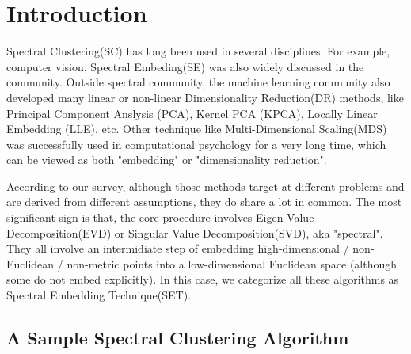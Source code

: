 \pagebreak
\setcounter{tocdepth}{3}
\tableofcontents
\pagebreak



\section{Introduction}
\label{sec:introduction}

Spectral Clustering(SC) has long been used in several disciplines. 
For example, computer vision\cite{shi2000normalized}.
Spectral Embeding(SE) was 
also widely discussed in the community\cite{brand2003unifying}. 
Outside spectral community, the machine learning community also 
developed many linear or non-linear Dimensionality Reduction(DR) methods, 
like Principal Component Anslysis (PCA), Kernel PCA (KPCA)\cite{scholkopf1998kpca}, 
Locally Linear Embedding (LLE)\cite{roweis2000lle}, etc. 
Other technique like Multi-Dimensional Scaling(MDS) was successfully 
used in computational psychology for a very long time\cite{borg2005modern}, 
which can be viewed as both "embedding" or "dimensionality reduction".


According to our survey, although those methods target at different problems
and are derived from different assumptions, they do share a lot in common. 
The most significant sign is that, the core procedure involves 
Eigen Value Decomposition(EVD) or Singular Value Decomposition(SVD), aka "spectral". 
They all involve an intermidiate step of embedding high-dimensional / 
non-Euclidean / non-metric points into a low-dimensional Euclidean space
(although some do not embed explicitly). In this case, we categorize all 
these algorithms as Spectral Embedding Technique(SET). 


\subsection{A Sample Spectral Clustering Algorithm}


